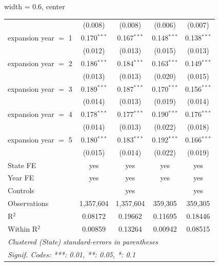 \begin{table}[htbp]
\begin{adjustbox}{width = 0.6\textwidth, center}
\begin{tabular}{lcccc}
                               & (0.008)       & (0.008)       & (0.006)       & (0.007)\\   
         expansion year $=$ 1  & 0.170$^{***}$ & 0.167$^{***}$ & 0.148$^{***}$ & 0.138$^{***}$\\   
                               & (0.012)       & (0.013)       & (0.015)       & (0.013)\\   
         expansion year $=$ 2  & 0.186$^{***}$ & 0.184$^{***}$ & 0.163$^{***}$ & 0.149$^{***}$\\   
                               & (0.013)       & (0.013)       & (0.020)       & (0.015)\\   
         expansion year $=$ 3  & 0.189$^{***}$ & 0.187$^{***}$ & 0.170$^{***}$ & 0.156$^{***}$\\   
                               & (0.014)       & (0.013)       & (0.019)       & (0.014)\\   
         expansion year $=$ 4  & 0.178$^{***}$ & 0.177$^{***}$ & 0.190$^{***}$ & 0.176$^{***}$\\   
                               & (0.014)       & (0.013)       & (0.022)       & (0.018)\\   
         expansion year $=$ 5  & 0.180$^{***}$ & 0.183$^{***}$ & 0.192$^{***}$ & 0.166$^{***}$\\   
                               & (0.015)       & (0.014)       & (0.022)       & (0.019)\\   
         State FE              & yes           & yes           & yes           & yes\\  
         Year FE               & yes           & yes           & yes           & yes\\  
         Controls              &               & yes           &               & yes\\  
         Observations          & 1,357,604     & 1,357,604     & 359,305       & 359,305\\  
         R$^2$                 & 0.08172       & 0.19662       & 0.11695       & 0.18446\\  
         Within R$^2$          & 0.00859       & 0.13264       & 0.00942       & 0.08515\\  
         \midrule \midrule
         \multicolumn{5}{l}{\emph{Clustered (State) standard-errors in parentheses}}\\
         \multicolumn{5}{l}{\emph{Signif. Codes: ***: 0.01, **: 0.05, *: 0.1}}\\
      \end{tabular}
   \end{adjustbox}
\end{table}


